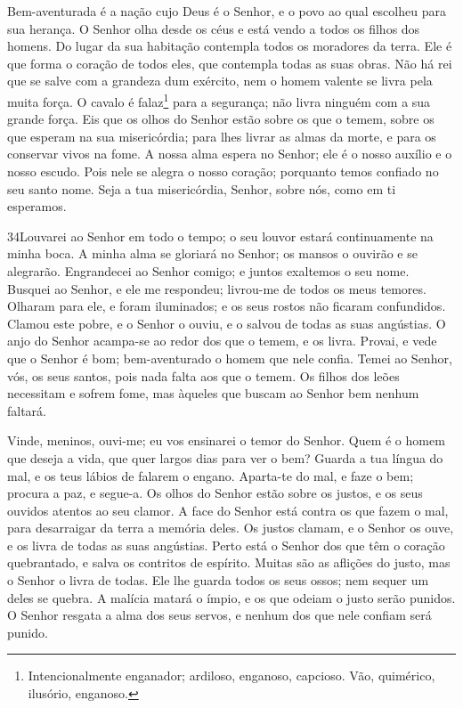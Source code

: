 Bem-aventurada é a nação cujo Deus é o Senhor, e o povo ao qual
escolheu para sua herança. O Senhor olha desde os céus e está
vendo a todos os filhos dos homens. Do lugar da sua habitação
contempla todos os moradores da terra. Ele é que forma o
coração de todos eles, que contempla todas as suas obras. Não
há rei que se salve com a grandeza dum exército, nem o homem valente
se livra pela muita força. O cavalo é
falaz\footnote{Intencionalmente enganador; ardiloso, enganoso,
capcioso. Vão, quimérico, ilusório, enganoso.} para a segurança; não
livra ninguém com a sua grande força. Eis que os olhos do
Senhor estão sobre os que o temem, sobre os que esperam na sua
misericórdia; para lhes livrar as almas da morte, e para os
conservar vivos na fome. A nossa alma espera no Senhor; ele é
o nosso auxílio e o nosso escudo. Pois nele se alegra o nosso
coração; porquanto temos confiado no seu santo nome. Seja a
tua misericórdia, Senhor, sobre nós, como em ti esperamos.

\bigskip

\lettrine{34}{}Louvarei ao Senhor em todo o tempo; o seu louvor
estará continuamente na minha boca. A minha alma se gloriará no
Senhor; os mansos o ouvirão e se alegrarão. Engrandecei ao
Senhor comigo; e juntos exaltemos o seu nome. Busquei ao Senhor,
e ele me respondeu; livrou-me de todos os meus temores. Olharam
para ele, e foram iluminados; e os seus rostos não ficaram
confundidos. Clamou este pobre, e o Senhor o ouviu, e o salvou
de todas as suas angústias. O anjo do Senhor acampa-se ao redor
dos que o temem, e os livra. Provai, e vede que o Senhor é bom;
bem-aventurado o homem que nele confia. Temei ao Senhor, vós, os
seus santos, pois nada falta aos que o temem. Os filhos dos
leões necessitam e sofrem fome, mas àqueles que buscam ao Senhor bem
nenhum faltará.

Vinde, meninos, ouvi-me; eu vos ensinarei o temor do Senhor.
Quem é o homem que deseja a vida, que quer largos dias para
ver o bem? Guarda a tua língua do mal, e os teus lábios de
falarem o engano. Aparta-te do mal, e faze o bem; procura a
paz, e segue-a. Os olhos do Senhor estão sobre os justos, e
os seus ouvidos atentos ao seu clamor. A face do Senhor está
contra os que fazem o mal, para desarraigar da terra a memória
deles. Os justos clamam, e o Senhor os ouve, e os livra de
todas as suas angústias. Perto está o Senhor dos que têm o
coração quebrantado, e salva os contritos de espírito. Muitas
são as aflições do justo, mas o Senhor o livra de todas. Ele
lhe guarda todos os seus ossos; nem sequer um deles se quebra.
A malícia matará o ímpio, e os que odeiam o justo serão
punidos. O Senhor resgata a alma dos seus servos, e nenhum
dos que nele confiam será punido.

